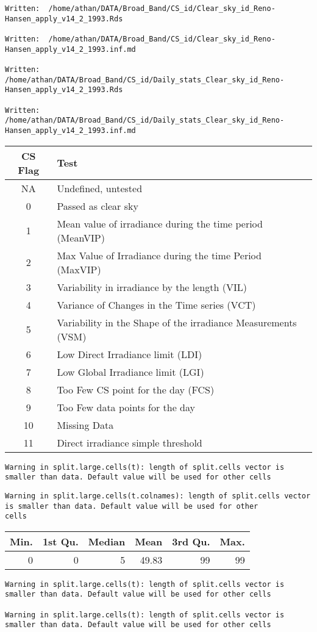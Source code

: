 \documentclass[
  10pt,
  a4paper,oneside]{article}
\begin{document}
\begin{verbatim}
Written:  /home/athan/DATA/Broad_Band/CS_id/Clear_sky_id_Reno-Hansen_apply_v14_2_1993.Rds 

Written:  /home/athan/DATA/Broad_Band/CS_id/Clear_sky_id_Reno-Hansen_apply_v14_2_1993.inf.md 

Written:  /home/athan/DATA/Broad_Band/CS_id/Daily_stats_Clear_sky_id_Reno-Hansen_apply_v14_2_1993.Rds 

Written:  /home/athan/DATA/Broad_Band/CS_id/Daily_stats_Clear_sky_id_Reno-Hansen_apply_v14_2_1993.inf.md 
\end{verbatim}

\begin{longtable}[]{@{}cl@{}}
\toprule
CS Flag & Test\tabularnewline
\midrule
\endhead
NA & Undefined, untested\tabularnewline
0 & Passed as clear sky\tabularnewline
1 & Mean value of irradiance during the time period (MeanVIP)\tabularnewline
2 & Max Value of Irradiance during the time Period (MaxVIP)\tabularnewline
3 & Variability in irradiance by the length (VIL)\tabularnewline
4 & Variance of Changes in the Time series (VCT)\tabularnewline
5 & Variability in the Shape of the irradiance Measurements (VSM)\tabularnewline
6 & Low Direct Irradiance limit (LDI)\tabularnewline
7 & Low Global Irradiance limit (LGI)\tabularnewline
8 & Too Few CS point for the day (FCS)\tabularnewline
9 & Too Few data points for the day\tabularnewline
10 & Missing Data\tabularnewline
11 & Direct irradiance simple threshold\tabularnewline
\bottomrule
\end{longtable}

\begin{verbatim}
Warning in split.large.cells(t): length of split.cells vector is smaller than data. Default value will be used for other cells
\end{verbatim}

\begin{verbatim}
Warning in split.large.cells(t.colnames): length of split.cells vector is smaller than data. Default value will be used for other
cells
\end{verbatim}

\begin{longtable}[]{@{}rrrrrr@{}}
\toprule
Min. & 1st Qu. & Median & Mean & 3rd Qu. & Max.\tabularnewline
\midrule
\endhead
0 & 0 & 5 & 49.83 & 99 & 99\tabularnewline
\bottomrule
\end{longtable}

\begin{verbatim}
Warning in split.large.cells(t): length of split.cells vector is smaller than data. Default value will be used for other cells

Warning in split.large.cells(t): length of split.cells vector is smaller than data. Default value will be used for other cells
\end{verbatim}
\end{document}
